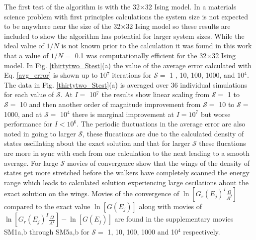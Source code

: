 \documentclass[aps,pre,reprint,superscriptaddress,showkeys]{revtex4-2}
\begin{document}
The first test of the algorithm is with the 32$\times$32 Ising model. In a materials science problem with first principles calculations the system size is not expected to be anywhere near the size of the  32$\times$32 Ising model so these results are included to show the algorithm has potential for larger system sizes. While the ideal value of $1/N$ is not known prior to the calculation it was found in this work that a value of $1/N=$ 0.1 was computationally efficient for the 32$\times$32 Ising model. In Fig. \ref{thirtytwo_Stest}(a) the value of the average error calculated with Eq. \ref{avg_error} is shown up to 10$^7$ iterations for $\mathcal{S}=$ 1 , 10, 100, 1000, and 10$^4$. The data in Fig. \ref{thirtytwo_Stest}(a) is averaged over 36 individual simulations for each value of $\mathcal{S}$. At $I=$ 10$^7$ the results show linear scaling from $\mathcal{S}=$ 1 to $\mathcal{S}=$ 10 and then another order of magnitude improvement from $\mathcal{S}=$ 10 to $\mathcal{S}=$ 1000, and at $\mathcal{S}=$ 10$^4$ there is marginal improvement at $I=10^7$ but worse performance for $I<10^6$.  The periodic fluctuations in the average error are also noted in going to larger $\mathcal{S}$, these flucations are due to the calculated density of states oscillating about the exact solution and that for larger $\mathcal{S}$  these flucations are more in sync with each from one calculation to the next leading to a smooth average. For large $\mathcal{S}$ movies of convergence show that the wings of the density of states get more stretched before the walkers have completely scanned the energy range which leads to calculated solution experiencing large oscilations about the exact solution on the wings. Movies of the convergence of $\ln[G_r(E_j)^I\frac{\Omega}{A^I}]$ compared to the exact value $\ln[G(E_j)]$ along with movies of $\ln[G_r(E_j)^I\frac{\Omega}{A^I}] - \ln[G(E_j)]$ are found in the supplementary movies SM1a,b through SM5a,b for $\mathcal{S}=$ 1, 10, 100, 1000 and 10$^4$ respectively.  
\end{document}
